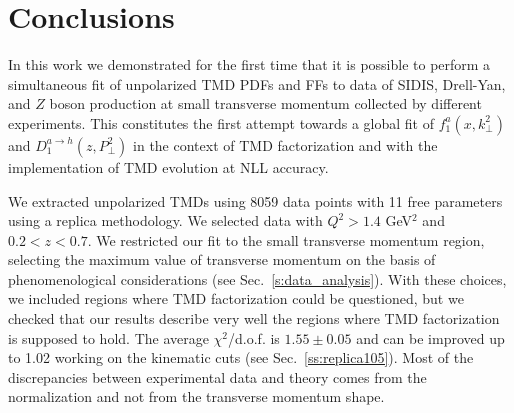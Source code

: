 \documentclass[aps,preprintnumbers,showpacs,nofootinbib,superscriptaddress,floatfix]{revtex4}
\begin{document}





\section{Conclusions}
\label{s:conclusions}


In this work we demonstrated for the first time that it is possible 
to perform a
simultaneous fit of unpolarized TMD PDFs and FFs 
to data of SIDIS, Drell-Yan, and $Z$
boson production at small transverse momentum collected by different experiments. 
This constitutes the first attempt towards a global fit of 
$f_1^a(x,k_\perp^2)$ and $D_1^{a \to h}(z,P_\perp^2)$ in the context of TMD
factorization and with the implementation of 
TMD evolution at NLL accuracy. %
  
We extracted unpolarized TMDs using 8059 data points with 11 free parameters
using a replica methodology. We selected data with 
$Q^2 > 1.4$ GeV$^2$ and $0.2 < z < 0.7$. We restricted our fit to the small
transverse momentum region, selecting the maximum value of transverse momentum
on the basis of phenomenological considerations
(see Sec.~\ref{s:data_analysis}). With these choices, 
we included regions where TMD
factorization could be questioned, but we checked that our results describe 
very well the regions where TMD factorization is supposed to hold. 
The average $\chi^2$/d.o.f. is $1.55 \pm 0.05$ and can be improved up to 1.02 working on the kinematic cuts (see Sec.~\ref{ss:replica105}). 
Most of the discrepancies between experimental data and theory comes from the
normalization and not from the transverse momentum shape. 
\end{document}
